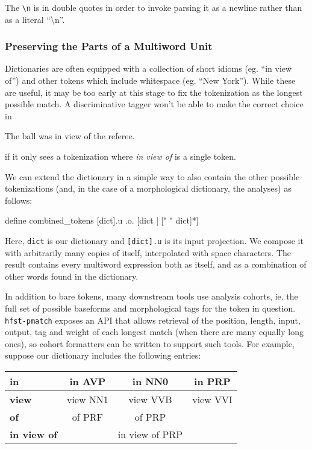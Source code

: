 \documentclass{llncs}
\begin{document}
The \verb+\n+ is in double quotes in order to invoke parsing it as a newline
rather than as a literal ``\textbackslash n''.

\subsubsection{Preserving the Parts of a Multiword Unit}

Dictionaries are often equipped with a collection of short idioms (eg.\@
``in view of'') and other tokens which include whitespace (eg.\@
``New York''). While these are useful, it may be too early at this stage
to fix the tokenization as the longest possible match. A discriminative
tagger won't be able to make the correct choice in

\begin{exe}
\item The ball was in view of the referee.
  \label{inview}
\end{exe}

if it only sees a tokenization where \emph{in view of} is a single token.

We can extend the dictionary in a simple way to also contain the other
possible tokenizations (and, in the case of a morphological dictionary,
the analyses) as follows:

\begin{framed}
\begin{verb}
define combined_tokens [dict].u .o. [dict | [" " dict]*]  
\end{verb}
\end{framed}

Here, \verb+dict+ is our dictionary and \verb+[dict].u+ is its input
projection. We compose it with arbitrarily many copies of itself,
interpolated with space characters. The result contains every multiword
expression both as itself, and as a combination of other words found
in the dictionary.

In addition to bare tokens, many downstream tools use analysis cohorts, ie.\@
the full set of possible baseforms and morphological tags for the token in
question. \verb+hfst-pmatch+ exposes an API that allows retrieval of the
position, length, input, output, tag and weight of each longest match (when
there are many equally long ones), so cohort formatters can be written to
support such tools. For example, suppose our dictionary includes the
following entries:

\begin{table}[H]
  \begin{center}
\begin{tabular}{| l | c  c  c |}
  \hline
  \textbf{in} & in AVP & in NN0 & in PRP \\
  \hline
  \textbf{view} & view NN1 & view VVB & view VVI \\
  \hline
\textbf{of} & of PRF & of PRP & \\
\hline
\textbf{in view of} & & in view of PRP & \\
\hline
\end{tabular}
\end{center}
\end{table}
\end{document}
